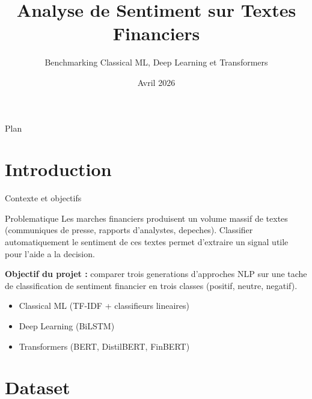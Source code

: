 \documentclass[aspectratio=169, 11pt]{beamer}
\title[Sentiment Analysis]{Analyse de Sentiment sur Textes Financiers}
\subtitle{Benchmarking Classical ML, Deep Learning et Transformers}
\author[]{}
\institute[Paris 1]{Universit\'e Paris 1 Panth\'eon-Sorbonne\\Master MoSEF -- Deep Learning / NLP}
\date{Avril 2026}
\begin{document}
\begin{frame}[plain]
  \titlepage
\end{frame}

\begin{frame}{Plan}
  \tableofcontents
\end{frame}

\section{Introduction}

\begin{frame}{Contexte et objectifs}
  \begin{block}{Problematique}
    Les marches financiers produisent un volume massif de textes (communiques de presse,
    rapports d'analystes, depeches). Classifier automatiquement le sentiment de ces
    textes permet d'extraire un signal utile pour l'aide a la decision.
  \end{block}
  \vspace{0.3cm}
  \textbf{Objectif du projet :} comparer trois generations d'approches NLP sur une
  tache de classification de sentiment financier en trois classes (positif, neutre, negatif).
  \vspace{0.3cm}
  \begin{itemize}
    \item Classical ML (TF-IDF + classifieurs lineaires)
    \item Deep Learning (BiLSTM)
    \item Transformers (BERT, DistilBERT, FinBERT)
  \end{itemize}
\end{frame}

\section{Dataset}
\end{document}
